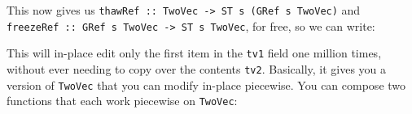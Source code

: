\documentclass[]{article}
\newenvironment{Shaded}{}{}
\newcommand{\DataTypeTok}[1]{\textcolor[rgb]{0.56,0.13,0.00}{#1}}
\newcommand{\DecValTok}[1]{\textcolor[rgb]{0.25,0.63,0.44}{#1}}
\newcommand{\KeywordTok}[1]{\textcolor[rgb]{0.00,0.44,0.13}{\textbf{#1}}}
\newcommand{\NormalTok}[1]{#1}
\newcommand{\OperatorTok}[1]{\textcolor[rgb]{0.40,0.40,0.40}{#1}}
\newcommand{\OtherTok}[1]{\textcolor[rgb]{0.00,0.44,0.13}{#1}}
\begin{document}
This now gives us
\texttt{thawRef\ ::\ TwoVec\ -\textgreater{}\ ST\ s\ (GRef\ s\ TwoVec)} and
\texttt{freezeRef\ ::\ GRef\ s\ TwoVec\ -\textgreater{}\ ST\ s\ TwoVec}, for
free, so we can write:

\begin{Shaded}
\end{Shaded}

This will in-place edit only the first item in the \texttt{tv1} field one
million times, without ever needing to copy over the contents \texttt{tv2}.
Basically, it gives you a version of \texttt{TwoVec} that you can modify
in-place piecewise. You can compose two functions that each work piecewise on
\texttt{TwoVec}:
\end{document}
